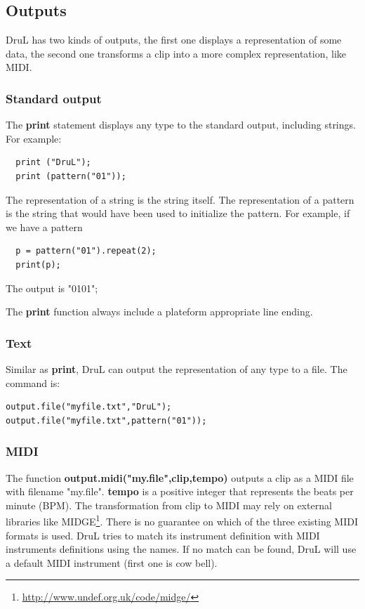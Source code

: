 \documentclass[11pt,twoside]{article}
\begin{document}
\subsection{Outputs}

DruL has two kinds of outputs, the first one displays a
representation of some data, the second one transforms a clip into a
more complex representation, like MIDI.

\subsubsection{Standard output}

The \textbf{print} statement displays any type to the standard
output, including strings. For example:
\begin{verbatim}
  print ("DruL");
  print (pattern("01"));
\end{verbatim}

The representation of a string is the string itself. The representation
of a pattern is the string that would have been used to initialize
the pattern. For example, if we have a pattern
\begin{verbatim}
  p = pattern("01").repeat(2);
  print(p);
\end{verbatim}
The output is "0101";

The \textbf{print} function always include a plateform appropriate line
ending.

\subsubsection{Text}

Similar as \textbf{print}, DruL can output the representation of any type 
to a file. The command is:
\begin{verbatim}
output.file("myfile.txt","DruL");
output.file("myfile.txt",pattern("01"));
\end{verbatim}

\subsubsection{MIDI}

The function \textbf{output.midi("my.file",clip,tempo)} outputs a clip as a MIDI
file with filename "my.file". \textbf{tempo} is a positive integer that
represents the beats per minute (BPM). 
The transformation from clip to MIDI may rely
on external libraries like MIDGE\footnote{\url{http://www.undef.org.uk/code/midge/}}. There is no guarantee on which of the three existing MIDI formats is used.
DruL tries to match its instrument definition with MIDI instruments definitions
using the names. If no match can be found, DruL will use a default MIDI instrument (first one is cow bell).
\end{document}
